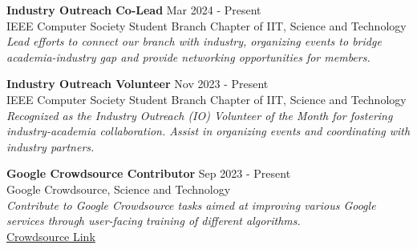\documentclass[10pt,letterpaper]{article}
\begin{document}
\textbf{Industry Outreach Co-Lead} \hfill Mar 2024 - Present \\
IEEE Computer Society Student Branch Chapter of IIT, Science and Technology \\
\textit{Lead efforts to connect our branch with industry, organizing events to bridge academia-industry gap and provide networking opportunities for members.}

\textbf{Industry Outreach Volunteer} \hfill Nov 2023 - Present \\
IEEE Computer Society Student Branch Chapter of IIT, Science and Technology \\
\textit{Recognized as the Industry Outreach (IO) Volunteer of the Month for fostering industry-academia collaboration. Assist in organizing events and coordinating with industry partners.}

\textbf{Google Crowdsource Contributor} \hfill Sep 2023 - Present \\
Google Crowdsource, Science and Technology \\
\textit{Contribute to Google Crowdsource tasks aimed at improving various Google services through user-facing training of different algorithms.} \\
\href{https://crowdsource.app.goo.gl/wk6v}{Crowdsource Link}
\end{document}
